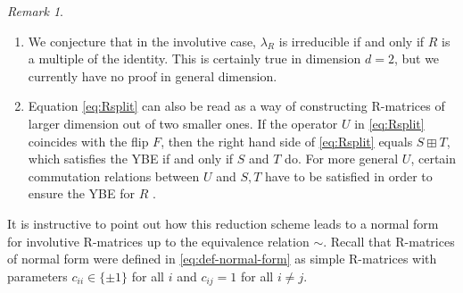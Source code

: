 \documentclass[12pt,a4paper]{amsart}
\numberwithin{equation}{section}
\theoremstyle{remark}
\newtheorem{remark}[theorem]{Remark}
\newcommand{\la}{\lambda}
\begin{document}
\begin{remark}\leavevmode
    \begin{enumerate}
        \item We conjecture that in the involutive case, $\la_R$ is irreducible if and only if $R$ is a multiple of the identity. This is certainly true in dimension $d=2$, but we currently have no proof in general dimension.
        \item Equation \eqref{eq:Rsplit} can also be read as a way of constructing R-matrices of larger dimension out of two smaller ones. If the operator $U$ in \eqref{eq:Rsplit} coincides with the flip $F$, then the right hand side of \eqref{eq:Rsplit} equals $S\boxplus T$, which satisfies the YBE if and only if $S$ and $T$ do. For more general $U$, certain commutation relations between $U$ and $S,T$ have to be satisfied in order to ensure the YBE for $R$ \cite{MajidMarkl:1996}.
    \end{enumerate}
\end{remark}

It is instructive to point out how this reduction scheme leads to a normal form for involutive R-matrices up to the equivalence relation $\sim$. Recall that R-matrices of normal form were defined in \eqref{eq:def-normal-form} as simple R-matrices with parameters $c_{ii}\in\{\pm1\}$ for all $i$ and $c_{ij}=1$ for all $i\neq j$.
\end{document}
